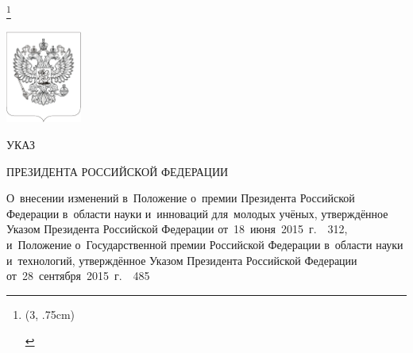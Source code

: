 \documentclass[12pt, a4paper]{extarticle}
\makeatletter
\newcommand{\asterism}{
	\vspace*{2pt}
	{\noindent\hspace*{\fill}
	\smash{
	\raisebox{-.5ex}{
		\setlength{\tabcolsep}{-.5pt}
			\begin{tabular}{@{}cc@{}}
				\multicolumn2c*\\[-2ex]*&*
			\end{tabular}}}\hspace*{\fill}}\par}
\makeatother
\begin{document}
\let\thefootnote\relax\footnote{
	\centering %
	\begin{pspicture}(3, .75cm)
	\end{pspicture}
}

\begin{center}
	\thispagestyle{empty}

	\setBold[.3]
	
	\vspace*{-1cm}
	\includegraphics[width=2.5cm]{./emblem_black_bordered} \medskip
	
	\huge{У}\Large{КАЗ} \bigskip
	
	\Large{П}\normalsize{РЕЗИДЕНТА} \Large{Р}\normalsize{ОССИЙСКОЙ} \Large{Ф}\normalsize{ЕДЕРАЦИИ} \bigskip\bigskip
	
	\begin{minipage}{.95\textwidth}
		\setBold[.3]
		\centering\normalsize
		О~внесении изменений в~Положение о~премии Президента Российской Федерации в~области науки и~инноваций для~молодых учёных, утверждённое Указом Президента Российской Федерации от~18~июня~2015~г.~\textnumero~312, и~Положение о~Государственной премии Российской Федерации в~области науки и~технологий, утверждённое Указом Президента Российской Федерации от~28~сентября~2015~г.~\textnumero~485
	\end{minipage}
	\bigskip

	\unsetBold
\end{center}

\asterism
\end{document}
